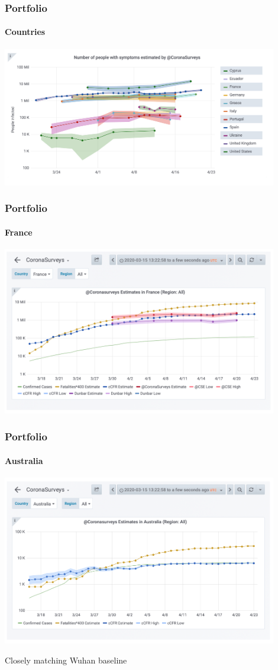 \documentclass{beamer}
\begin{document}
\begin{frame}
  \frametitle{Portfolio}
  \framesubtitle{Countries}
  \begin{center}
  \includegraphics[width=0.9\textwidth]{Countries.png}
  \end{center}
\end{frame}

\begin{frame}
  \frametitle{Portfolio}
  \framesubtitle{France}
  \begin{center}
  \includegraphics[width=0.9\textwidth]{France.png}
  \end{center}
\end{frame}

\begin{frame}
  \frametitle{Portfolio}
  \framesubtitle{Australia}
  \begin{center}
  \includegraphics[width=0.9\textwidth]{Australia.png}
  \end{center}
  Closely matching Wuhan baseline
\end{frame}
\end{document}
